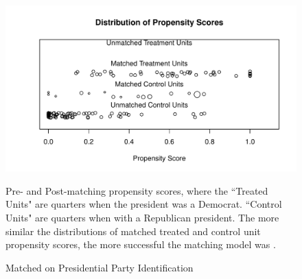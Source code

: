 \documentclass[a4paper]{article}\usepackage{graphicx, color}
\makeatletter
\def\maxwidth{ %
  \ifdim\Gin@nat@width>\linewidth
    \linewidth
  \else
    \Gin@nat@width
  \fi
}
\newenvironment{knitrout}{}{} %
\makeatother
\begin{document}

\begin{figure}[h]
  \caption{Matched on Presidential Party Identification}
  \label{PresPropensityScores}
\begin{knitrout}
\color{fgcolor}

{\centering \includegraphics[width=\maxwidth]{figure/PresPropensity} 

}



\end{knitrout}

  \begin{singlespace}
      {\scriptsize{Pre- and Post-matching propensity scores, where the ``Treated Units" are quarters when the president was a Democrat. ``Control Units" are quarters when with a Republican president. The more similar the distributions of matched treated and control unit propensity scores, the more successful the matching model was \cite[17]{Hollyer2012}.}}
  \end{singlespace}
\end{figure}
\end{document}
